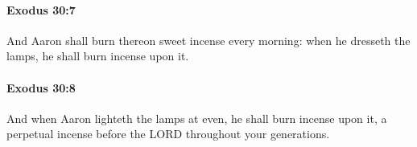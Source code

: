 		\paragraph{Exodus 30:7} %
			\label{EXODUS-30-7}

			And Aaron shall burn thereon sweet incense every morning: when he dresseth the lamps, he shall burn incense upon it.


		\paragraph{Exodus 30:8} %
			\label{EXODUS-30-8}

			And when Aaron lighteth the lamps at even, he shall burn incense upon it, a perpetual incense before the LORD throughout your generations.


